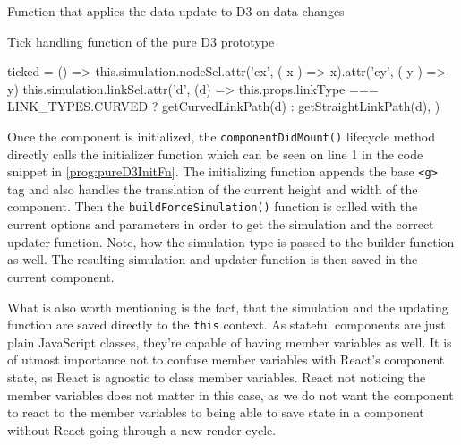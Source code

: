 \begin{program}
\caption{Function that applies the data update to D3 on data changes}
\label{prog:pureD3updateApply}
\end{program}

\begin{program}
\caption{Tick handling function of the pure D3 prototype}
\label{prog:pureD3Tick}
\begin{JsCode}
ticked = () => {
  this.simulation.nodeSel.attr('cx', ({ x }) => x).attr('cy', ({ y }) => y)
  this.simulation.linkSel.attr('d', (d) =>
    this.props.linkType === LINK_TYPES.CURVED ? getCurvedLinkPath(d) : getStraightLinkPath(d),
  )
}
\end{JsCode}
\end{program}

Once the component is initialized, the \texttt{componentDidMount()} lifecycle method directly calls the initializer function which can be seen on line 1 in the code snippet in \ref{prog:pureD3InitFn}. The initializing function appends the base \texttt{<g>} tag and also handles the translation of the current height and width of the component. Then the \texttt{buildForceSimulation()} function is called with the current options and parameters in order to get the simulation and the correct updater function. Note, how the simulation type is passed to the builder function as well. The resulting simulation and updater function is then saved in the current component.

What is also worth mentioning is the fact, that the simulation and the updating function are saved directly to the \texttt{this} context. As stateful components are just plain JavaScript classes, they're capable of having member variables as well. It is of utmost importance not to confuse member variables with React's component state, as React is agnostic to class member variables. React not noticing the member variables does not matter in this case, as we do not want the component to react to the member variables to being able to save state in a component without React going through a new render cycle. 

